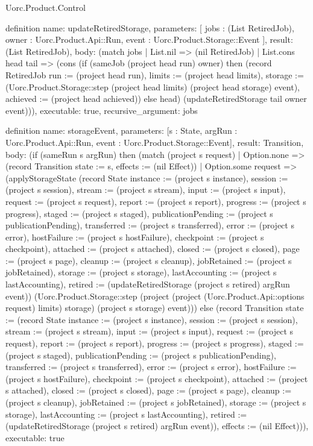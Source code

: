 \begin{lexlean}{Uorc.Product.Control}
\begin{semanticmodule}
definition{
  name: updateRetiredStorage,
  parameters: [
    jobs : (List RetiredJob),
    owner : Uorc.Product.Api::Run,
    event : Uorc.Product.Storage::Event
  ],
  result: (List RetiredJob),
  body: (match jobs
    | List.nil => (nil RetiredJob)
    | List.cons head tail => (cons (if (sameJob (project head run) owner) then (record RetiredJob {run := (project head run), limits := (project head limits), storage := (Uorc.Product.Storage::step (project head limits) (project head storage) event), achieved := (project head achieved)}) else head) (updateRetiredStorage tail owner event))),
  executable: true,
  recursive_argument: jobs
}

definition{
  name: storageEvent,
  parameters: [s : State, argRun : Uorc.Product.Api::Run, event : Uorc.Product.Storage::Event],
  result: Transition,
  body: (if (sameRun s argRun) then (match (project s request)
    | Option.none => (record Transition {state := s, effects := (nil Effect)})
    | Option.some request => (applyStorageState (record State {instance := (project s instance), session := (project s session), stream := (project s stream), input := (project s input), request := (project s request), report := (project s report), progress := (project s progress), staged := (project s staged), publicationPending := (project s publicationPending), transferred := (project s transferred), error := (project s error), hostFailure := (project s hostFailure), checkpoint := (project s checkpoint), attached := (project s attached), closed := (project s closed), page := (project s page), cleanup := (project s cleanup), jobRetained := (project s jobRetained), storage := (project s storage), lastAccounting := (project s lastAccounting), retired := (updateRetiredStorage (project s retired) argRun event)}) (Uorc.Product.Storage::step (project (project (Uorc.Product.Api::options request) limits) storage) (project s storage) event))) else (record Transition {state := (record State {instance := (project s instance), session := (project s session), stream := (project s stream), input := (project s input), request := (project s request), report := (project s report), progress := (project s progress), staged := (project s staged), publicationPending := (project s publicationPending), transferred := (project s transferred), error := (project s error), hostFailure := (project s hostFailure), checkpoint := (project s checkpoint), attached := (project s attached), closed := (project s closed), page := (project s page), cleanup := (project s cleanup), jobRetained := (project s jobRetained), storage := (project s storage), lastAccounting := (project s lastAccounting), retired := (updateRetiredStorage (project s retired) argRun event)}), effects := (nil Effect)})),
  executable: true
}


\end{semanticmodule}
\end{lexlean}
